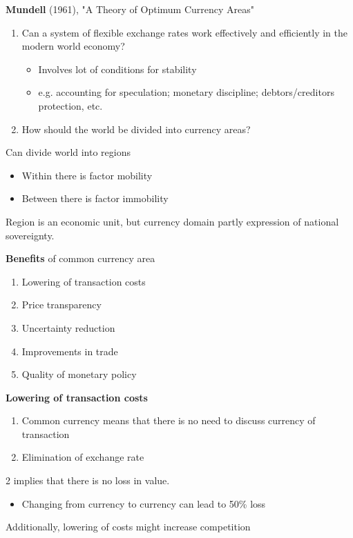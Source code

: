\documentclass{beamer}
\begin{document}
\begin{frame}
  \textbf{Mundell} (1961), "A Theory of Optimum Currency Areas"
  \medskip
  \begin{enumerate}
    \item Can a system of flexible exchange rates work effectively and efficiently in the modern world economy?   
    \begin{itemize}
       \item Involves lot of conditions for stability
       \item e.g. accounting for speculation; monetary discipline; debtors/creditors protection, etc.
     \end{itemize} 
    \item How should the world be divided into currency areas?    
  \end{enumerate}
  \medskip
  Can divide world into regions
  \begin{itemize}
     \item Within there is factor mobility
     \item Between there is factor immobility
   \end{itemize} 
   \medskip
  Region is an economic unit, but currency domain partly expression of national sovereignty.
\end{frame}


\begin{frame}
  \textbf{Benefits} of common currency area
  \begin{enumerate}
    \item Lowering of transaction costs
    \item Price transparency
    \item Uncertainty reduction
    \item Improvements in trade
    \item Quality of monetary policy
  \end{enumerate}
\end{frame}

\begin{frame}
  \textbf{Lowering of transaction costs}\\
  \begin{enumerate}
    \item Common currency means that there is no need to discuss currency of transaction
    \item Elimination of exchange rate
  \end{enumerate}
  2 implies that there is no loss in value. 
  \begin{itemize}
    \item Changing from currency to currency can lead to 50\% loss
  \end{itemize}
  \medskip
  Additionally, lowering of costs might increase competition  
\end{frame}
\end{document}
